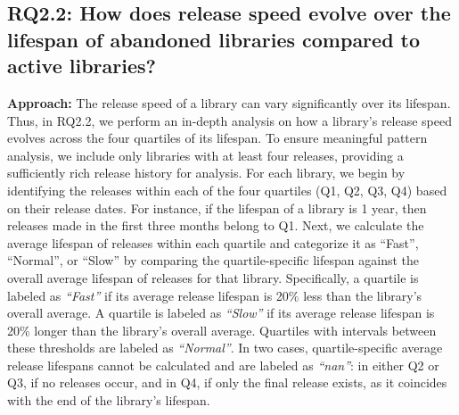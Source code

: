 \subsection{RQ2.2: How does release speed evolve over the lifespan of abandoned libraries compared to active libraries?}



\noindent \textbf{Approach:} The release speed of a library can vary significantly over its lifespan. Thus, in RQ2.2, we perform an in-depth analysis on how a library's release speed evolves across the four quartiles of its lifespan. To ensure meaningful pattern analysis, we include only libraries with at least four releases, providing a sufficiently rich release history for analysis. For each library, we begin by identifying the releases within each of the four quartiles (Q1, Q2, Q3, Q4) based on their release dates. For instance, if the lifespan of a library is 1 year, then releases made in the first three months belong to Q1. Next, we calculate the average lifespan of releases within each quartile and categorize it as ``Fast'', ``Normal'', or ``Slow'' by comparing the quartile-specific lifespan against the overall average lifespan of releases for that library. Specifically, a quartile is labeled as \textit{``Fast''} if its average release lifespan is 20\% less than the library’s overall average.
A quartile is labeled as \textit{``Slow''} if its average release lifespan is 20\% longer than the library’s overall average. Quartiles with intervals between these thresholds are labeled as \textit{``Normal''}. In two cases, quartile-specific average release lifespans cannot be calculated and are labeled as \textit{``nan''}: in either Q2 or Q3, if no releases occur, and in Q4, if only the final release exists, as it coincides with the end of the library's lifespan.



